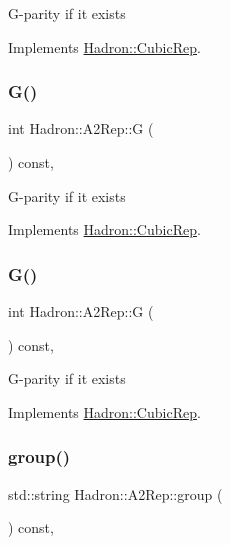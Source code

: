 G-\/parity if it exists 

Implements \mbox{\hyperlink{structHadron_1_1CubicRep_a52104e43266d1614c00bbd1c3b395458}{Hadron\+::\+Cubic\+Rep}}.

\mbox{\label{structHadron_1_1A2Rep_a6c2da481eeb98634c640e8f17a569eea}} 
\subsubsection{\texorpdfstring{G()}{G()}\hspace{0.1cm}{\footnotesize\ttfamily [2/3]}}
{\footnotesize\ttfamily int Hadron\+::\+A2\+Rep\+::G (\begin{DoxyParamCaption}{ }\end{DoxyParamCaption}) const\hspace{0.3cm}{\ttfamily [inline]}, {\ttfamily [virtual]}}

G-\/parity if it exists 

Implements \mbox{\hyperlink{structHadron_1_1CubicRep_a52104e43266d1614c00bbd1c3b395458}{Hadron\+::\+Cubic\+Rep}}.

\mbox{\label{structHadron_1_1A2Rep_a6c2da481eeb98634c640e8f17a569eea}} 
\subsubsection{\texorpdfstring{G()}{G()}\hspace{0.1cm}{\footnotesize\ttfamily [3/3]}}
{\footnotesize\ttfamily int Hadron\+::\+A2\+Rep\+::G (\begin{DoxyParamCaption}{ }\end{DoxyParamCaption}) const\hspace{0.3cm}{\ttfamily [inline]}, {\ttfamily [virtual]}}

G-\/parity if it exists 

Implements \mbox{\hyperlink{structHadron_1_1CubicRep_a52104e43266d1614c00bbd1c3b395458}{Hadron\+::\+Cubic\+Rep}}.

\mbox{\label{structHadron_1_1A2Rep_a3bc9b6dc8fcd507991dfc7dbad16e7a4}} 
\subsubsection{\texorpdfstring{group()}{group()}\hspace{0.1cm}{\footnotesize\ttfamily [1/3]}}
{\footnotesize\ttfamily std\+::string Hadron\+::\+A2\+Rep\+::group (\begin{DoxyParamCaption}{ }\end{DoxyParamCaption}) const\hspace{0.3cm}{\ttfamily [inline]}, {\ttfamily [virtual]}}

